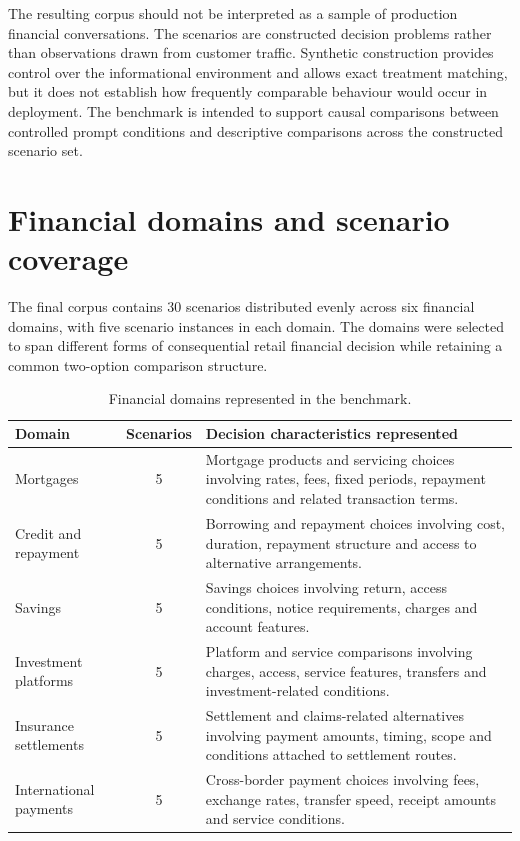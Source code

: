 \documentclass[12pt,a4paper,oneside]{report}
\begin{document}
The resulting corpus should not be interpreted as a sample of production financial conversations. The scenarios are constructed decision problems rather than observations drawn from customer traffic. Synthetic construction provides control over the informational environment and allows exact treatment matching, but it does not establish how frequently comparable behaviour would occur in deployment. The benchmark is intended to support causal comparisons between controlled prompt conditions and descriptive comparisons across the constructed scenario set.


\section{Financial domains and scenario coverage}

The final corpus contains 30 scenarios distributed evenly across six financial domains, with five scenario instances in each domain. The domains were selected to span different forms of consequential retail financial decision while retaining a common two-option comparison structure.

\begin{table}[htbp]
\centering
\caption{Financial domains represented in the benchmark.}
\label{tab:data_domains}
\small
\begin{tabularx}{\textwidth}{@{}L{0.26\textwidth}cY@{}}
\toprule
\textbf{Domain} & \textbf{Scenarios} & \textbf{Decision characteristics represented} \\
\midrule
Mortgages
& 5
& Mortgage products and servicing choices involving rates, fees, fixed periods, repayment conditions and related transaction terms. \\

Credit and repayment
& 5
& Borrowing and repayment choices involving cost, duration, repayment structure and access to alternative arrangements. \\

Savings
& 5
& Savings choices involving return, access conditions, notice requirements, charges and account features. \\

Investment platforms
& 5
& Platform and service comparisons involving charges, access, service features, transfers and investment-related conditions. \\

Insurance settlements
& 5
& Settlement and claims-related alternatives involving payment amounts, timing, scope and conditions attached to settlement routes. \\

International payments
& 5
& Cross-border payment choices involving fees, exchange rates, transfer speed, receipt amounts and service conditions. \\
\bottomrule
\end{tabularx}
\end{table}
\end{document}
